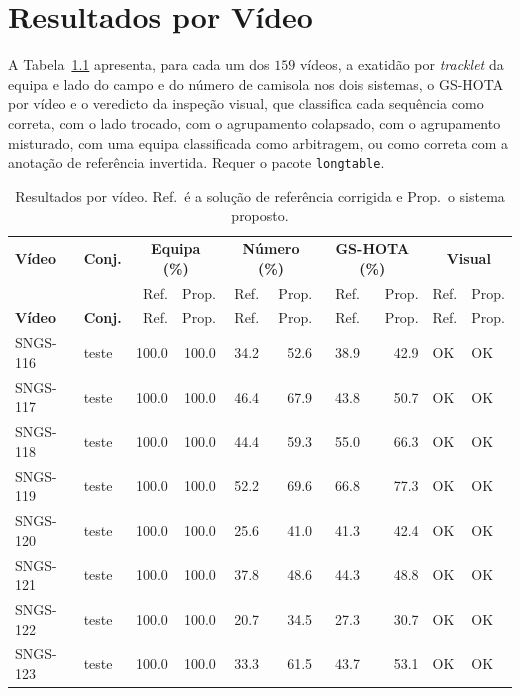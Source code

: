 \chapter{Resultados por Vídeo}\label{anexo:videos}

A Tabela~\ref{tab:anexo-videos} apresenta, para cada um dos $159$ vídeos, a exatidão por \emph{tracklet} da equipa e lado do campo e do número de camisola nos dois sistemas, o GS-HOTA por vídeo e o veredicto da inspeção visual, que classifica cada sequência como correta, com o lado trocado, com o agrupamento colapsado, com o agrupamento misturado, com uma equipa classificada como arbitragem, ou como correta com a anotação de referência invertida. Requer o pacote \texttt{longtable}.

\begin{small}
\begin{longtable}{|l|l|r|r|r|r|r|r|l|l|}
\caption{Resultados por vídeo. Ref.\ é a solução de referência corrigida e Prop.\ o sistema proposto.}\label{tab:anexo-videos}\\
\hline \textbf{Vídeo} & \textbf{Conj.} & \multicolumn{2}{|c|}{\textbf{Equipa (\%)}} & \multicolumn{2}{|c|}{\textbf{Número (\%)}} & \multicolumn{2}{|c|}{\textbf{GS-HOTA (\%)}} & \multicolumn{2}{|c|}{\textbf{Visual}} \\
 & & Ref. & Prop. & Ref. & Prop. & Ref. & Prop. & Ref. & Prop. \\ \hline
\endfirsthead
\hline \textbf{Vídeo} & \textbf{Conj.} & Ref. & Prop. & Ref. & Prop. & Ref. & Prop. & Ref. & Prop. \\ \hline
\endhead
\hline
\endfoot
SNGS-116 & teste & 100.0 & 100.0 & 34.2 & 52.6 & 38.9 & 42.9 & OK & OK \\ \hline
SNGS-117 & teste & 100.0 & 100.0 & 46.4 & 67.9 & 43.8 & 50.7 & OK & OK \\ \hline
SNGS-118 & teste & 100.0 & 100.0 & 44.4 & 59.3 & 55.0 & 66.3 & OK & OK \\ \hline
SNGS-119 & teste & 100.0 & 100.0 & 52.2 & 69.6 & 66.8 & 77.3 & OK & OK \\ \hline
SNGS-120 & teste & 100.0 & 100.0 & 25.6 & 41.0 & 41.3 & 42.4 & OK & OK \\ \hline
SNGS-121 & teste & 100.0 & 100.0 & 37.8 & 48.6 & 44.3 & 48.8 & OK & OK \\ \hline
SNGS-122 & teste & 100.0 & 100.0 & 20.7 & 34.5 & 27.3 & 30.7 & OK & OK \\ \hline
SNGS-123 & teste & 100.0 & 100.0 & 33.3 & 61.5 & 43.7 & 53.1 & OK & OK \\ \hline

\end{longtable}
\end{small}
